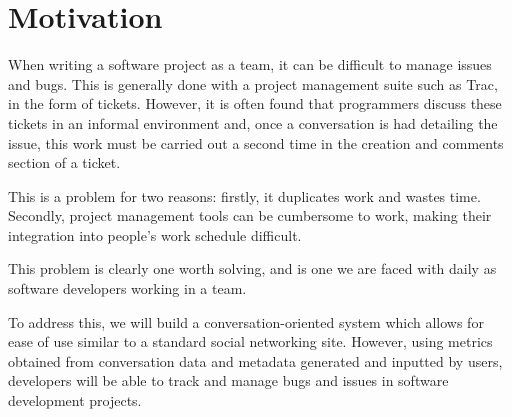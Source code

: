\documentclass[10pt]{article}
\begin{document}
\section{Motivation} 
When writing a software project as a team, it can be difficult to manage issues and bugs. This is generally done with a project management suite such as Trac, in the form of tickets. However, it is often found that programmers discuss these tickets in an informal environment and, once a conversation is had detailing the issue, this work must be carried out a second time in the creation and comments section of a ticket. \par
This is a problem for two reasons: firstly, it duplicates work and wastes time. Secondly, project management tools can be cumbersome to work, making their integration into people's work schedule difficult.\par
This problem is clearly one worth solving, and is one we are faced with daily as software developers working in a team. \par 
To address this, we will build a conversation-oriented system which allows for ease of use similar to a standard social networking site. However, using metrics obtained from conversation data and metadata generated and inputted by users, developers will be able to track and manage bugs and issues in software development projects. \par


\end{document}
